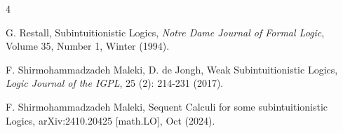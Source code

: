 \documentclass[12pt]{article}
\begin{document}
\begin{thebibliography}{4}



G. Restall, Subintuitionistic Logics, \textit{Notre Dame Journal of Formal Logic}, Volume 35, Number 1, Winter (1994).


F. Shirmohammadzadeh Maleki, D.  de Jongh,  Weak Subintuitionistic Logics, \textit{Logic Journal of the IGPL}, 25 (2): 214-231 (2017).         

F. Shirmohammadzadeh Maleki, Sequent Calculi for some subintuitionistic Logics, arXiv:2410.20425 [math.LO], Oct (2024).

\end{thebibliography}
\end{document}
